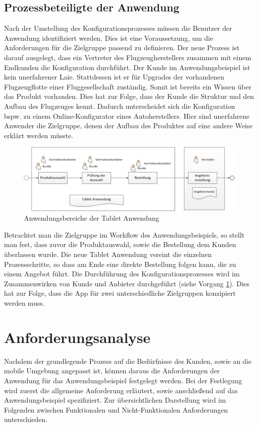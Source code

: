 \subsection{Prozessbeteiligte der Anwendung}
Nach der Umstellung des Konfigurationsprozesses müssen die Benutzer der Anwendung identifiziert werden. Dies ist eine Voraussetzung, um die Anforderungen für die Zielgruppe passend zu definieren. Der neue Prozess ist darauf ausgelegt, dass ein Vertreter des Flugzeugherstellers zusammen mit einem Endkunden die Konfiguration durchführt. Der Kunde im Anwendungsbeispiel ist kein unerfahrener Laie. Stattdessen ist er für Upgrades der vorhandenen Flugzeugflotte einer Fluggesellschaft zuständig. Somit ist bereits ein Wissen über das Produkt vorhanden. Dies hat zur Folge, dass der Kunde die Struktur und den Aufbau des Flugzeuges kennt. Dadurch unterscheidet sich die Konfiguration bspw. zu einem Online-Konfigurator eines Autoherstellers. Hier sind unerfahrene Anwender die Zielgruppe, denen der Aufbau des Produktes auf eine andere Weise erklärt werden müsste. \par 
\begin{figure}
\centering
\includegraphics[width=\hsize]{images/konfigurationsprozess_neu}
\caption{Anwendungsbereiche der Tablet Anwendung}
\label{newWorkflow}
\end{figure}
Betrachtet man die Zielgruppe im Workflow des Anwendungsbeispiels,  so stellt man fest, dass
zuvor die Produktauswahl, sowie die Bestellung dem Kunden überlassen wurde. Die neue Tablet Anwendung vereint die einzelnen Prozessschritte, so dass am Ende eine direkte Bestellung folgen kann, die zu einem Angebot führt. Die Durchführung des Konfigurationsprozesses wird im Zusammenwirken von Kunde und Anbieter durchgeführt (siehe Vorgang \ref{newWorkflow}). Dies hat zur Folge, dass die App für zwei unterschiedliche Zielgruppen konzipiert werden muss.


\section{Anforderungsanalyse} \label{requirements}
Nachdem der grundlegende Prozess auf die Bedürfnisse des Kunden, sowie an die mobile Umgebung angepasst ist, können daraus die Anforderungen der Anwendung für das Anwendungsbeispiel festgelegt werden. Bei der Festlegung wird zuerst die allgemeine Anforderung erläutert, sowie anschließend auf das Anwendungsbeispiel spezifiziert. Zur übersichtlichen Darstellung wird im Folgenden zwischen Funktionalen und Nicht-Funktionalen Anforderungen unterschieden. 

